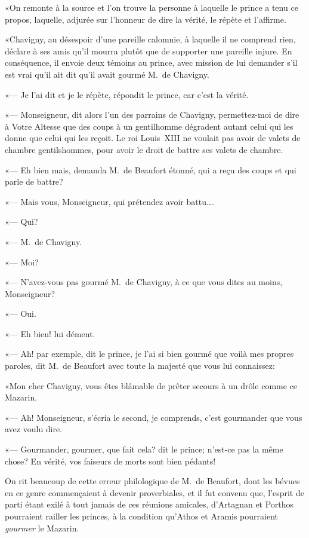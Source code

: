 «On remonte à la source et l'on trouve la personne à laquelle le prince a tenu ce propos, laquelle, adjurée sur l'honneur de dire la vérité, le répète et l'affirme.

«Chavigny, au désespoir d'une pareille calomnie, à laquelle il ne comprend rien, déclare à ses amis qu'il mourra plutôt que de supporter une pareille injure. En conséquence, il envoie deux témoins au prince, avec mission de lui demander s'il est vrai qu'il ait dit qu'il avait gourmé M.~de Chavigny.

«— Je l'ai dit et je le répète, répondit le prince, car c'est la vérité.

«— Monseigneur, dit alors l'un des parrains de Chavigny, permettez-moi de dire à Votre Altesse que des coups à un gentilhomme dégradent autant celui qui les donne que celui qui les reçoit. Le roi Louis~XIII ne voulait pas avoir de valets de chambre gentilshommes, pour avoir le droit de battre ses valets de chambre.

«— Eh bien mais, demanda M.~de Beaufort étonné, qui a reçu des coups et qui parle de battre?

«— Mais vous, Monseigneur, qui prétendez avoir battu\dots.

«— Qui?

«— M.~de Chavigny.

«— Moi?

«— N'avez-vous pas gourmé M.~de Chavigny, à ce que vous dites au moins, Monseigneur?

«— Oui.

«— Eh bien! lui dément.

«— Ah! par exemple, dit le prince, je l'ai si bien gourmé que voilà mes propres paroles, dit M.~de Beaufort avec toute la majesté que vous lui connaissez:

«Mon cher Chavigny, vous êtes blâmable de prêter secours à un drôle comme ce Mazarin.

«— Ah! Monseigneur, s'écria le second, je comprends, c'est gourmander que vous avez voulu dire.

«— Gourmander, gourmer, que fait cela? dit le prince; n'est-ce pas la même chose? En vérité, vos faiseurs de morts sont bien pédants!

On rit beaucoup de cette erreur philologique de M.~de Beaufort, dont les bévues en ce genre commençaient à devenir proverbiales, et il fut convenu que, l'esprit de parti étant exilé à tout jamais de ces réunions amicales, d'Artagnan et Porthos pourraient railler les princes, à la condition qu'Athos et Aramis pourraient \textit{gourmer} le Mazarin.

